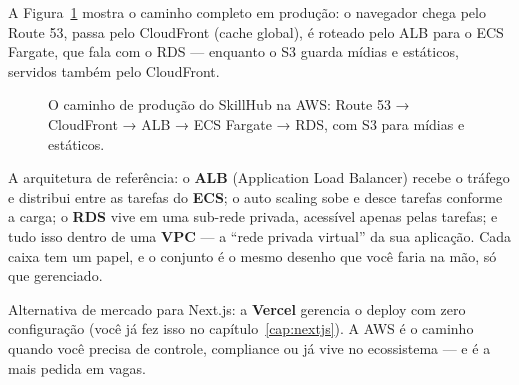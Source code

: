 A Figura~\ref{fig:aws-pipeline} mostra o caminho completo em produção: o
navegador chega pelo Route 53, passa pelo CloudFront (cache global), é
roteado pelo ALB para o ECS Fargate, que fala com o RDS — enquanto o S3
guarda mídias e estáticos, servidos também pelo CloudFront.

\begin{figure}[htbp]
  \centering
  \caption{O caminho de produção do SkillHub na AWS: Route 53 → CloudFront →
  ALB → ECS Fargate → RDS, com S3 para mídias e estáticos.}
  \label{fig:aws-pipeline}
\end{figure}

\begin{caixaconceito}
A arquitetura de referência: o \textbf{ALB} (Application Load Balancer)
recebe o tráfego e distribui entre as tarefas do \textbf{ECS}; o auto scaling
sobe e desce tarefas conforme a carga; o \textbf{RDS} vive em uma sub-rede
privada, acessível apenas pelas tarefas; e tudo isso dentro de uma
\textbf{VPC} — a ``rede privada virtual'' da sua aplicação. Cada caixa tem um
papel, e o conjunto é o mesmo desenho que você faria na mão, só que
gerenciado.
\end{caixaconceito}

\begin{caixadica}
Alternativa de mercado para Next.js: a \textbf{Vercel} gerencia o deploy com
zero configuração (você já fez isso no capítulo~\ref{cap:nextjs}). A AWS é o
caminho quando você precisa de controle, compliance ou já vive no ecossistema
— e é a mais pedida em vagas.
\end{caixadica}

